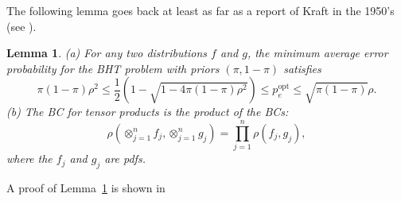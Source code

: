 \documentclass[conference,letterpaper]{IEEEtran}
\newtheorem{lemma}{Lemma}
\newcommand{\distA}{f}%
\newcommand{\distB}{g}%
\newcommand{\errorOpt}{p_e^{\mathrm{opt}}}
\begin{document}
The following lemma goes back at least as far as a report of Kraft in
the 1950's (see \cite{Kailath67}).\\[-1em]
\begin{lemma}
  \label{lem:bhatta-bounds}
  (a) For any two distributions $\distA$ and $\distB$, the minimum
  average error probability for the BHT problem with priors
  $(\pi, 1 - \pi)$ satisfies
  {\small
    \[\pi(1 - \pi)\rho^2 \le \frac 12(1 - \sqrt{1-4\pi(1 - \pi)\rho^2})
      \le \errorOpt \le \sqrt{\pi(1 - \pi)}\rho.\]
  }
  (b) The BC for tensor products is the product of the BCs:
  \[\rho(\otimes_{j = 1}^n \distA_j, \otimes_{j = 1}^n \distB_j) =
    \prod_{j = 1}^n \rho(\distA_j, \distB_j),\]
  where the $\distA_j$ and $\distB_j$ are pdfs.
\end{lemma}
A proof of Lemma~\ref{lem:bhatta-bounds} is shown in
\iftoggle{isit}{%
the technical report \cite{KangHajek21}.
}{%
Appendix~\ref{app:bhatta-bounds}.
}%
\end{document}

